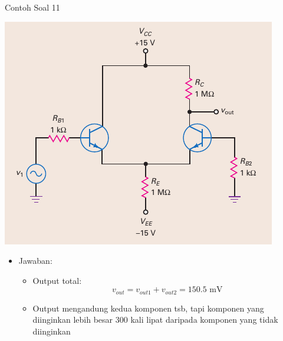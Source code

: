 \documentclass[aspectratio=169]{beamer}
\begin{document}
\begin{frame}{Contoh Soal 11}
	\begin{multicols}{2}
		\begin{center}
			\includegraphics[height=0.7\textheight]{gambar/01.fig22}
		\end{center}
		\columnbreak
		\begin{itemize}
			\item Jawaban:
			\begin{itemize}
				\item Output total:
				\[ v_{out} = v_{out1} + v_{out2} = 150.5 \text{ mV} \]
				\item Output mengandung kedua komponen tsb, tapi komponen yang diinginkan lebih besar 300 kali lipat daripada komponen yang tidak diinginkan
			\end{itemize}
		\end{itemize}
	\end{multicols}
\end{frame}
\end{document}
